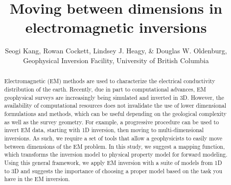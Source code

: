\documentclass{segabs}
\begin{document}
\title{Moving between dimensions in electromagnetic inversions}

\renewcommand{\thefootnote}{\fnsymbol{footnote}}

\author{Seogi Kang\footnotemark[1], Rowan Cockett, Lindsey J. Heagy, \& Douglas W. Oldenburg, Geophysical Inversion Facility, University of British Columbia}


\maketitle
\begin{abstract}
Electromagnetic (EM) methods are used to characterize the electrical conductivity distribution of the earth. Recently, due in part to computational advances, EM geophysical surveys are increasingly being simulated and inverted in 3D. However, the availability of computational resources does not invalidate the use of lower dimensional formulations and methods, which can be useful depending on the geological complexity as well as the survey geometry. For example, a progressive procedure can be used to invert EM data, starting with 1D inversion, then moving to multi-dimensional inversions. As such, we require a set of tools that allow a geophysicists to easily move between dimensions of the EM problem. In this study, we suggest a mapping function, which transforms the inversion model to physical property model for forward modeling. Using this general framework, we apply EM inversion with a suite of models from 1D to 3D and suggests the importance of choosing a proper model based on the task you have in the EM inversion.
\end{abstract}
\renewcommand{\figdir}{Fig} %
\end{document}
